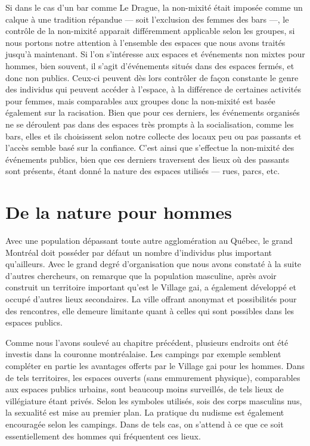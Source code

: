 Si dans le cas d'un bar comme Le Drague, la non-mixité était imposée comme un calque à une tradition répandue --- soit l'exclusion des femmes des bars ---, le contrôle de la non-mixité apparait différemment applicable selon les groupes, si nous portons notre attention à l'ensemble des espaces que nous avons traités jusqu'à maintenant.
Si l'on s'intéresse aux espaces et événements non mixtes pour hommes, bien souvent, il s'agit d'événements situés dans des espaces fermés, et donc non publics.
Ceux-ci peuvent dès lors contrôler de façon constante le genre des individus qui peuvent accéder à l'espace, à la différence de certaines activités pour femmes, mais comparables aux groupes donc la non-mixité est basée également sur la racisation.
Bien que pour ces derniers, les événements organisés ne se déroulent pas dans des espaces très prompts à la socialisation, comme les bars, elles et ils choisissent selon notre collecte des locaux peu ou pas passants et l'accès semble basé sur la confiance.
C'est ainsi que s'effectue la non-mixité des événements publics, bien que ces derniers traversent des lieux où des passants sont présents, étant donné la nature des espaces utilisés --- rues, parcs, etc.

\section{De la nature pour hommes}
\label{sec:de_la_nature_pour_hommes}

Avec une population dépassant toute autre agglomération au Québec, le grand Montréal doit posséder par défaut un nombre d'individus \lgbt{} plus important qu'ailleurs.
Avec le grand degré d'organisation que nous avons constaté à la suite d'autres chercheurs, on remarque que la population masculine, après avoir construit un territoire important qu'est le Village gai, a également développé et occupé d'autres lieux secondaires.
La ville offrant anonymat et possibilités pour des rencontres, elle demeure limitante quant à celles qui sont possibles dans les espaces publics.

Comme nous l'avons soulevé au chapitre précédent, plusieurs endroits ont été investis dans la couronne montréalaise.
Les campings par exemple semblent compléter en partie les avantages offerts par le Village gai pour les hommes.
Dans de tels territoires, les espaces ouverts (sans emmurement physique), comparables aux espaces publics urbains, sont beaucoup moins surveillés, de tels lieux de villégiature étant  privés.
Selon les symboles utilisés, sois des corps masculins nus, la sexualité est mise au premier plan.
La pratique du nudisme est également encouragée selon les campings.
Dans de tels cas, on s'attend à ce que ce soit essentiellement des hommes qui fréquentent ces lieux.

